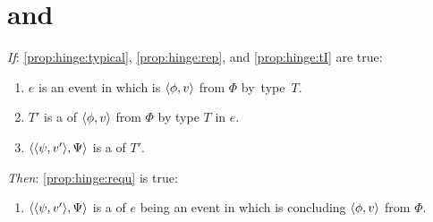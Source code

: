 \section{ and \tC{}}
\label{sec:typicalRequs}

\begin{note}
  \begin{proposition}
    \label{prop:hinge}


    \begin{itenum}
    \item[\emph{If}:]
      \ref{prop:hinge:typical}, \ref{prop:hinge:rep}, and \ref{prop:hinge:tI} are true:

      \begin{enumerate}[label=\alph*., ref=(\alph*), series=propHingeSer]
      \item
        \label{prop:hinge:typical}
        \(e\) is an event in which \vAgent{} is  \(\langle \phi, v \rangle\) from \(\Phi\) by~type~\(T\).
      \item
        \label{prop:hinge:rep}
        \(T'\) is a \tRep{} of \vAgent{} \tCV{} \(\langle \phi, v \rangle\) from \(\Phi\) by type \(T\) in \(e\).
      \item
        \label{prop:hinge:tI}
        \(\langle \langle \psi, v' \rangle, \Psi \rangle\) is a \tI{} of \(T'\).
      \end{enumerate}

    \item[\emph{Then}:]
      \ref{prop:hinge:requ} is true:
      \begin{enumerate}[label=\alph*., ref=(\alph*), resume*=propHingeSer]
      \item
        \label{prop:hinge:requ}
        \(\langle \langle \psi, v' \rangle, \Psi \rangle\) is a \requ{} of \(e\) being an event in which \vAgent{} is concluding \(\langle \phi, v \rangle\) from \(\Phi\).
      \end{enumerate}
    \end{itenum}
    \vspace{-\baselineskip}
  \end{proposition}


\end{note}
